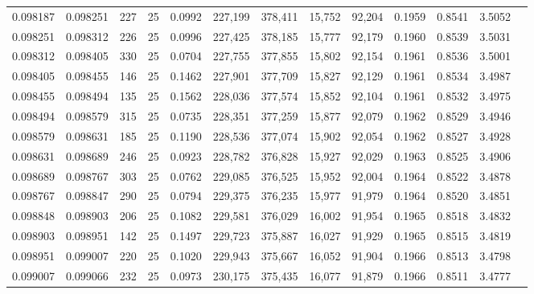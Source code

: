 \begin{tabular}{rrrrrrrrrrrrr}
0.098187 & 0.098251 &   227 &  25 &                                     0.0992 & 227,199 & 378,411 &  15,752 &  92,204 & 0.1959 & 0.8541 & 3.5052 \\
0.098251 & 0.098312 &   226 &  25 &                                     0.0996 & 227,425 & 378,185 &  15,777 &  92,179 & 0.1960 & 0.8539 & 3.5031 \\
0.098312 & 0.098405 &   330 &  25 &                                     0.0704 & 227,755 & 377,855 &  15,802 &  92,154 & 0.1961 & 0.8536 & 3.5001 \\
0.098405 & 0.098455 &   146 &  25 &                                     0.1462 & 227,901 & 377,709 &  15,827 &  92,129 & 0.1961 & 0.8534 & 3.4987 \\
0.098455 & 0.098494 &   135 &  25 &                                     0.1562 & 228,036 & 377,574 &  15,852 &  92,104 & 0.1961 & 0.8532 & 3.4975 \\
0.098494 & 0.098579 &   315 &  25 &                                     0.0735 & 228,351 & 377,259 &  15,877 &  92,079 & 0.1962 & 0.8529 & 3.4946 \\
0.098579 & 0.098631 &   185 &  25 &                                     0.1190 & 228,536 & 377,074 &  15,902 &  92,054 & 0.1962 & 0.8527 & 3.4928 \\
0.098631 & 0.098689 &   246 &  25 &                                     0.0923 & 228,782 & 376,828 &  15,927 &  92,029 & 0.1963 & 0.8525 & 3.4906 \\
0.098689 & 0.098767 &   303 &  25 &                                     0.0762 & 229,085 & 376,525 &  15,952 &  92,004 & 0.1964 & 0.8522 & 3.4878 \\
0.098767 & 0.098847 &   290 &  25 &                                     0.0794 & 229,375 & 376,235 &  15,977 &  91,979 & 0.1964 & 0.8520 & 3.4851 \\
0.098848 & 0.098903 &   206 &  25 &                                     0.1082 & 229,581 & 376,029 &  16,002 &  91,954 & 0.1965 & 0.8518 & 3.4832 \\
0.098903 & 0.098951 &   142 &  25 &                                     0.1497 & 229,723 & 375,887 &  16,027 &  91,929 & 0.1965 & 0.8515 & 3.4819 \\
0.098951 & 0.099007 &   220 &  25 &                                     0.1020 & 229,943 & 375,667 &  16,052 &  91,904 & 0.1966 & 0.8513 & 3.4798 \\
0.099007 & 0.099066 &   232 &  25 &                                     0.0973 & 230,175 & 375,435 &  16,077 &  91,879 & 0.1966 & 0.8511 & 3.4777 \\

\end{tabular}
